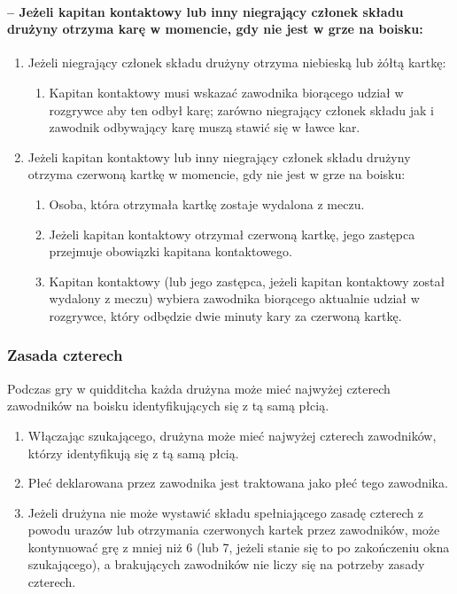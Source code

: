 \documentclass[12pt]{article}
\begin{document}
\paragraph{-- Jeżeli kapitan kontaktowy lub inny niegrający członek
składu drużyny otrzyma karę w momencie, gdy nie jest w grze na boisku:}

\begin{enumerate}
\item
    Jeżeli niegrający członek składu drużyny otrzyma niebieską lub żółtą
  kartkę:
  
  \begin{enumerate}
  \item
        Kapitan kontaktowy musi wskazać zawodnika biorącego udział w
    rozgrywce aby ten odbył karę; zarówno niegrający członek składu jak
    i zawodnik odbywający karę muszą stawić się w ławce kar.
      \end{enumerate}
\item
    Jeżeli kapitan kontaktowy lub inny niegrający członek składu drużyny
  otrzyma czerwoną kartkę w momencie, gdy nie jest w grze na boisku:
  
  \begin{enumerate}
  \item
        Osoba, która otrzymała kartkę zostaje wydalona z meczu.
      \item
        Jeżeli kapitan kontaktowy otrzymał czerwoną kartkę, jego zastępca
    przejmuje obowiązki kapitana kontaktowego.
      \item
        Kapitan kontaktowy (lub jego zastępca, jeżeli kapitan kontaktowy
    został wydalony z meczu) wybiera zawodnika biorącego aktualnie
    udział w rozgrywce, który odbędzie dwie minuty kary za czerwoną
    kartkę.
      \end{enumerate}
\end{enumerate}

\subsubsection{Zasada czterech}

Podczas gry w quidditcha każda drużyna może mieć najwyżej czterech
zawodników na boisku identyfikujących się z tą samą płcią.

\begin{enumerate}
\item
    Włączając szukającego, drużyna może mieć najwyżej czterech zawodników,
  którzy identyfikują się z tą samą płcią.
  \item
    Płeć deklarowana przez zawodnika jest traktowana jako płeć tego
  zawodnika.
  \item
    Jeżeli drużyna nie może wystawić składu spełniającego zasadę czterech
  z powodu urazów lub otrzymania czerwonych kartek przez zawodników,
  może kontynuować grę z mniej niż 6 (lub 7, jeżeli stanie się to po
  zakończeniu okna szukającego), a brakujących zawodników nie liczy się
  na potrzeby zasady czterech.
  \end{enumerate}
\end{document}
